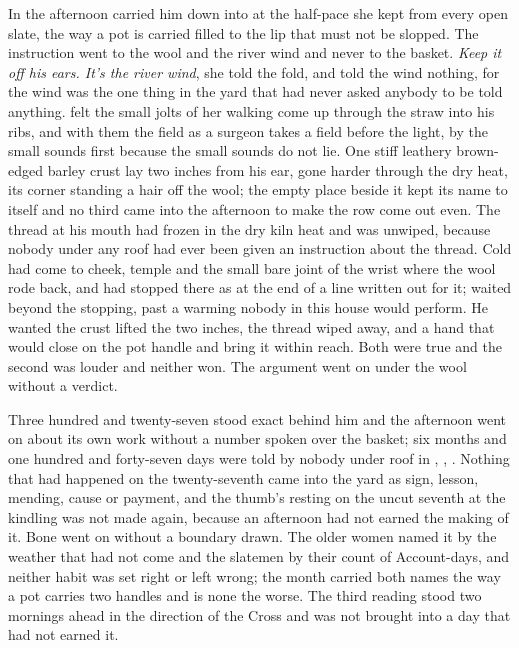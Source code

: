 In the afternoon  carried him down into  at the half-pace she kept from every open slate, the way a pot is carried filled to the lip that must not be slopped. The instruction went to the wool and the river wind and never to the basket. \emph{Keep it off his ears. It's the river wind}, she told the fold, and told the wind nothing, for the wind was the one thing in the yard that had never asked anybody to be told anything.  felt the small jolts of her walking come up through the straw into his ribs, and with them the field as a surgeon takes a field before the light, by the small sounds first because the small sounds do not lie. One stiff leathery brown-edged barley crust lay two inches from his ear, gone harder through the dry heat, its corner standing a hair off the wool; the empty place beside it kept its name to itself and no third came into the afternoon to make the row come out even. The thread at his mouth had frozen in the dry kiln heat and was unwiped, because nobody under any roof had ever been given an instruction about the thread. Cold had come to cheek, temple and the small bare joint of the wrist where the wool rode back, and had stopped there as at the end of a line written out for it;  waited beyond the stopping, past a warming nobody in this house would perform. He wanted the crust lifted the two inches, the thread wiped away, and a hand that would close on the pot handle and bring it within reach. Both were true and the second was louder and neither won. The argument went on under the wool without a verdict.

Three hundred and twenty-seven stood exact behind him and the afternoon went on about its own work without a number spoken over the basket; six months and one hundred and forty-seven days were told by nobody under  roof in , , . Nothing that had happened on the twenty-seventh came into the yard as sign, lesson, mending, cause or payment, and the thumb's resting on the uncut seventh at the kindling was not made again, because an afternoon had not earned the making of it. Bone went on without a boundary drawn. The older women named it by the weather that had not come and the slatemen by their count of Account-days, and neither habit was set right or left wrong; the month carried both names the way a pot carries two handles and is none the worse. The third reading stood two mornings ahead in the direction of the Cross and was not brought into a day that had not earned it.

